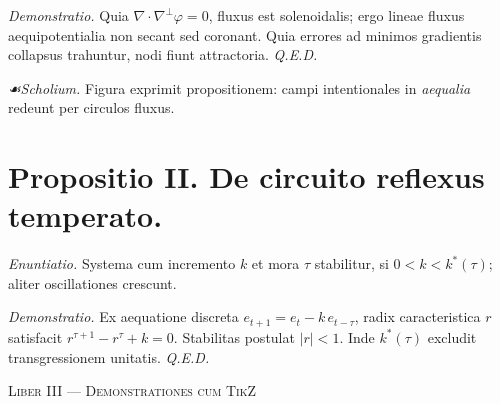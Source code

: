 \documentclass[12pt]{article}
\newcommand{\dingir}{\centerline{\Large \cunei{𒀭}}}
\newcommand{\scholia}{\textit{☙\;}}
\newcommand{\divider}{\vspace{1em}\dingir\vspace{1em}}
\newcommand{\Liber}[1]{\vspace{1ex}\begin{center}\Large\textsc{Liber #1}\end{center}\vspace{-0.5ex}\dingir\vspace{0.5ex}}
\begin{document}
\textit{Demonstratio.} Quia $\nabla\cdot\nabla^\perp \varphi=0$, fluxus est solenoidalis; ergo lineae fluxus aequipotentialia non secant sed coronant. Quia errores ad minimos gradientis collapsus trahuntur, nodi fiunt attractoria. \textit{Q.E.D.}

\begin{center}
\end{center}

\textit{\scholia Scholium.} Figura exprimit propositionem: campi intentionales in \textit{aequalia} redeunt per circulos fluxus.

\section*{Propositio II. \; De circuito reflexus temperato.}

\textit{Enuntiatio.} \; Systema cum incremento $k$ et mora $\tau$ stabilitur, si \;$0<k<k^\ast(\tau)$; aliter oscillationes crescunt.

\textit{Demonstratio.} Ex aequatione discreta $e_{t+1}=e_t - k\,e_{t-\tau}$, radix caracteristica $r$ satisfacit $r^{\tau+1}-r^\tau+k=0$. Stabilitas postulat $|r|<1$. Inde $k^\ast(\tau)$ excludit transgressionem unitatis. \textit{Q.E.D.}

\begin{center}
\end{center}

\divider

\Liber{III — Demonstrationes cum TikZ}
\end{document}

